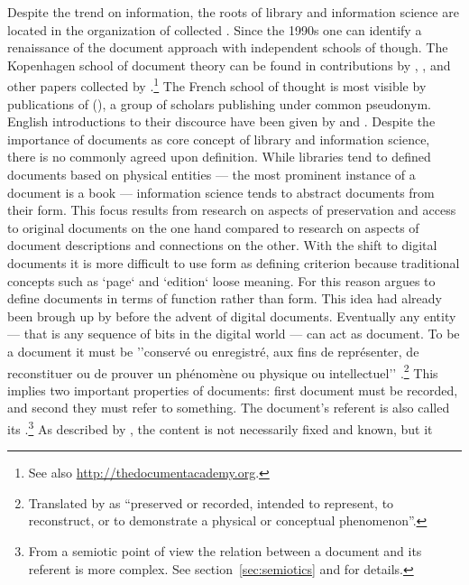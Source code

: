 Despite the trend on information, the roots of library and information science
are located in the organization of collected . Since
the 1990s one can identify a renaissance of the document approach with
independent schools of though. The Kopenhagen school of document theory can be
found in contributions by \textcite{Lund2009}, \textcite{Hjorland2007},
\textcite{Orom2007} and other papers collected by
\textcite{Skare2007}.\footnote{See also \url{http://thedocumentacademy.org}.}
The French school of thought is most visible by publications of 
(\citeyear{Pedauque2003,Pedauque2006,Pedauque2007,Pedauque2011}), a
group of scholars publishing under common pseudonym. English introductions to
their discource have been given by \textcite{Truex2007} and
\textcite{Gradmann2008}.  Despite the importance of documents as core concept
of library and information science, there is no commonly agreed upon
definition. While libraries tend to defined documents based on physical
entities --- the most prominent instance of a document is a book ---
information science tends to abstract documents from their form. This focus
results from research on aspects of preservation and access to original
documents on the one hand compared to research on aspects of document
descriptions and connections on the other. With the shift to digital documents
it is more difficult to use form as defining criterion because traditional
concepts such as `page` and `edition` loose meaning. For this reason
\textcite{Buckland1997,Buckland1998} argues to define documents in terms of
function rather than form. This idea had already been brough up by
\textcite{Briet1951} before the advent of digital documents.  Eventually any
entity --- that is any sequence of bits in the digital world --- can act as
document. To be a document it must be ''conserv\'e ou enregistr\'e, aux fins de
repr\'esenter, de reconstituer ou de prouver un ph\'enom\`ene ou physique ou
intellectuel'' \cite[p. 7]{Briet1951}.\footnote{Translated by
\textcite{Buckland1997} as ``preserved or recorded, intended to represent, to
reconstruct, or to demonstrate a physical or conceptual phenomenon''.} This
implies two important properties of documents: first document must be recorded,
and second they must refer to something. The document's referent is also called
its .\footnote{From a semiotic point of view the relation between
a document and its referent is more complex. See section~\ref{sec:semiotics}
and \textcite{Brier2008,Brier2006} for details.} As described by
\textcite{Yeo2010}, the content is not necessarily fixed and known, but it
